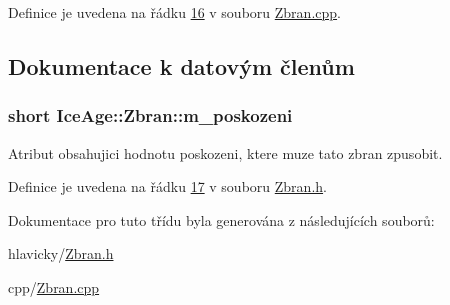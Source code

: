 Definice je uvedena na řádku \hyperlink{Zbran_8cpp_source_l00016}{16} v souboru \hyperlink{Zbran_8cpp_source}{Zbran.\+cpp}.



\subsection{Dokumentace k datovým členům}
\subsubsection[{\texorpdfstring{m\+\_\+poskozeni}{m_poskozeni}}]{\setlength{\rightskip}{0pt plus 5cm}short Ice\+Age\+::\+Zbran\+::m\+\_\+poskozeni\hspace{0.3cm}{\ttfamily [private]}}\hypertarget{classIceAge_1_1Zbran_a7a671b3caa7e80a70b5fce3d5b123418}{}\label{classIceAge_1_1Zbran_a7a671b3caa7e80a70b5fce3d5b123418}


Atribut obsahujici hodnotu poskozeni, ktere muze tato zbran zpusobit. 



Definice je uvedena na řádku \hyperlink{Zbran_8h_source_l00017}{17} v souboru \hyperlink{Zbran_8h_source}{Zbran.\+h}.



Dokumentace pro tuto třídu byla generována z následujících souborů\+:\begin{DoxyCompactItemize}
\item 
hlavicky/\hyperlink{Zbran_8h}{Zbran.\+h}\item 
cpp/\hyperlink{Zbran_8cpp}{Zbran.\+cpp}\end{DoxyCompactItemize}
